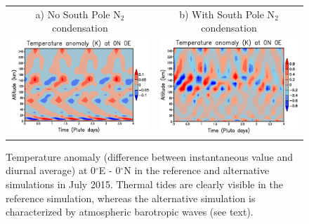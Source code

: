 \begin{figure}
  \begin{center}
\renewcommand{\arraystretch}{0.2}
\begin{tabular}[h]{cc}
\hspace{-2.cm}
   a) No South Pole N$_2$ condensation & b) With South Pole N$_2$ condensation \\
\hspace{-2.cm}
   \includegraphics[width=8.cm,angle=-0,clip]{figures/tide_T_0E_0N.eps} &
   \includegraphics[width=8.cm,angle=-0,clip]{figures/tide_T_0E_0N_pole2.eps} \\
\end{tabular}
    \caption{
\label{fg:tide}
Temperature anomaly (difference between instantaneous value and diurnal average) at  
0$^\circ$E - 0$^\circ$N in the reference and alternative simulations in July 2015. Thermal tides are
clearly visible in the reference simulation, whereas the alternative simulation is characterized by
atmospheric barotropic waves (see text). 
}
  \end{center}
\end{figure}







